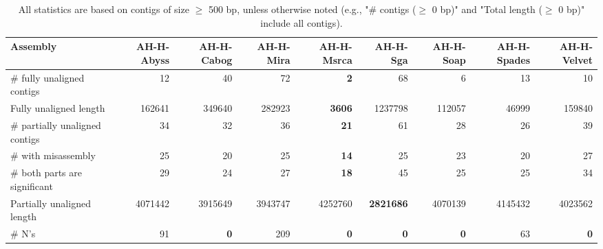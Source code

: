 \documentclass[12pt,a4paper]{article}
\begin{document}
\begin{table}[ht]
\begin{center}
\caption{All statistics are based on contigs of size $\geq$ 500 bp, unless otherwise noted (e.g., "\# contigs ($\geq$ 0 bp)" and "Total length ($\geq$ 0 bp)" include all contigs).}
\begin{tabular}{|l*{8}{|r}|}
\hline
Assembly & AH-H-Abyss & AH-H-Cabog & AH-H-Mira & AH-H-Msrca & AH-H-Sga & AH-H-Soap & AH-H-Spades & AH-H-Velvet \\ \hline
\# fully unaligned contigs & 12 & 40 & 72 & {\bf 2} & 68 & 6 & 13 & 10 \\ \hline
Fully unaligned length & 162641 & 349640 & 282923 & {\bf 3606} & 1237798 & 112057 & 46999 & 159840 \\ \hline
\# partially unaligned contigs & 34 & 32 & 36 & {\bf 21} & 61 & 28 & 26 & 39 \\ \hline
\hspace{5mm}\# with misassembly & 25 & 20 & 25 & {\bf 14} & 25 & 23 & 20 & 27 \\ \hline
\hspace{5mm}\# both parts are significant & 29 & 24 & 27 & {\bf 18} & 45 & 25 & 25 & 34 \\ \hline
Partially unaligned length & 4071442 & 3915649 & 3943747 & 4252760 & {\bf 2821686} & 4070139 & 4145432 & 4023562 \\ \hline
\# N's & 91 & {\bf 0} & 209 & {\bf 0} & {\bf 0} & {\bf 0} & 63 & {\bf 0} \\ \hline
\end{tabular}
\end{center}
\end{table}
\end{document}
